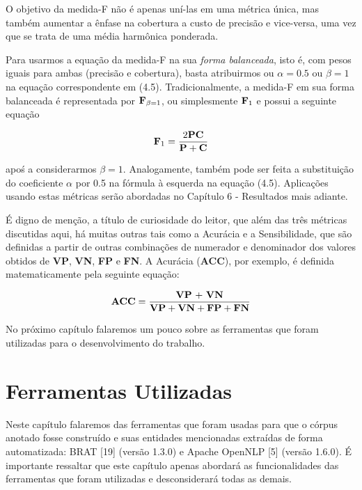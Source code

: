\documentclass[11pt]{report}
\begin{document}
O objetivo da medida-F não é apenas uní-las em uma métrica única, mas também aumentar a ênfase na cobertura a custo de precisão e vice-versa, uma vez que se trata de uma média harmônica ponderada.

Para usarmos a equação da medida-F na sua \textit{forma balanceada}, isto é, com pesos iguais para ambas (precisão e cobertura), basta atribuirmos ou $\alpha = 0.5$ ou  $\beta = 1$ na equação correspondente em (4.5). Tradicionalmente, a medida-F em sua forma balanceada é representada por $\text{\textbf{F}}_{\beta = 1}$, ou simplesmente $\text{\textbf{F}}_{1}$ e possui
a seguinte equação

\begin{equation}
 \text{\textbf{F}}_1 = \dfrac{2\text{\textbf{PC}}}{\text{\textbf{P}} + \text{\textbf{C}}}
\end{equation}

apoś a considerarmos $\beta = 1$. Analogamente, também pode ser feita a substituição do coeficiente $\alpha$ por 0.5 na fórmula à esquerda na equação (4.5).
Aplicações usando estas métricas serão abordadas no Capítulo 6 - Resultados mais adiante.

É digno de menção, a título de curiosidade do leitor, que além das três métricas discutidas aqui, há muitas outras tais como a Acurácia e a Sensibilidade, que são definidas
a partir de outras combinações de numerador e denominador dos valores obtidos de \textbf{VP}, \textbf{VN}, \textbf{FP} e \textbf{FN}. A Acurácia (\textbf{ACC}), por exemplo, é
definida matematicamente pela seguinte equação:

\begin{equation}
 \text{\textbf{ACC}} = \dfrac{\text{\textbf{VP} + \textbf{VN}}}{\text{\textbf{VP}} + \text{\textbf{VN}} + \text{\textbf{FP}} + \text{\textbf{FN}}}
\end{equation}

No próximo capítulo falaremos um pouco sobre as ferramentas que foram utilizadas para o desenvolvimento do trabalho.

\pagebreak
\chapter{Ferramentas Utilizadas}

\indent\indent Neste capítulo falaremos das ferramentas que foram usadas para que o córpus anotado fosse construído e suas entidades mencionadas extraídas
de forma automatizada: BRAT [19] (versão 1.3.0) e Apache OpenNLP [5] (versão 1.6.0). É importante ressaltar que este capítulo apenas abordará as funcionalidades das ferramentas que foram utilizadas e desconsiderará todas as
demais.
\end{document}

